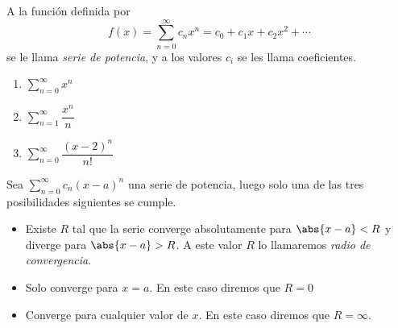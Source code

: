
\begin{frame}
  \begin{defn}
    A la función definida por
    $$f(x)=\sum_{n=0}^{\infty}c_n x^n=c_0+c_1x+c_2x^2+\cdots$$
    se le llama \emph{serie de potencia}, y a los valores $c_i$ se les llama coeficientes.\\
    \vspace{0.5cm}
  \end{defn}
\end{frame}

\begin{frame}
  \begin{egs}
    \begin{enumerate}[<+->]
      \item $\displaystyle\sum_{n=0}^{\infty} x^n$
      \vspace{0.25cm}
      \item $\displaystyle\sum_{n=1}^{\infty} \dfrac{x^n}{n}$
      \vspace{0.25cm}
      \item $\displaystyle\sum_{n=0}^{\infty} \dfrac{(x-2)^n}{n!}$
    \end{enumerate}
  \end{egs}
\end{frame}

\begin{frame}
  \begin{thm}
    Sea $\sum_{n=0}^\infty c_n(x-a)^n$ una serie de potencia, luego solo una de las tres posibilidades siguientes se cumple.\\
    \begin{itemize}
      \item Existe $R$ tal que la serie converge absolutamente para $\abs{x-a}<R$ y diverge para $\abs{x-a}>R$. A este valor $R$ lo llamaremos \emph{radio de convergencia}.\\
      \vspace{0.25cm}
      \item Solo converge para $x=a$. En este caso diremos que $R=0$\\
      \vspace{0.25cm}
      \item Converge para cualquier valor de $x$. En este caso diremos que $R=\infty$.
    \end{itemize}
  \end{thm}
\end{frame}

